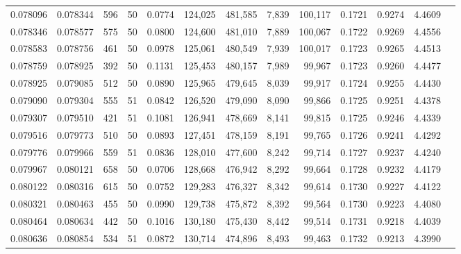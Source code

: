 \begin{tabular}{rrrrrrrrrrrrr}
0.078096 & 0.078344 &   596 &  50 &                                     0.0774 & 124,025 & 481,585 &   7,839 & 100,117 & 0.1721 & 0.9274 & 4.4609 \\
0.078346 & 0.078577 &   575 &  50 &                                     0.0800 & 124,600 & 481,010 &   7,889 & 100,067 & 0.1722 & 0.9269 & 4.4556 \\
0.078583 & 0.078756 &   461 &  50 &                                     0.0978 & 125,061 & 480,549 &   7,939 & 100,017 & 0.1723 & 0.9265 & 4.4513 \\
0.078759 & 0.078925 &   392 &  50 &                                     0.1131 & 125,453 & 480,157 &   7,989 &  99,967 & 0.1723 & 0.9260 & 4.4477 \\
0.078925 & 0.079085 &   512 &  50 &                                     0.0890 & 125,965 & 479,645 &   8,039 &  99,917 & 0.1724 & 0.9255 & 4.4430 \\
0.079090 & 0.079304 &   555 &  51 &                                     0.0842 & 126,520 & 479,090 &   8,090 &  99,866 & 0.1725 & 0.9251 & 4.4378 \\
0.079307 & 0.079510 &   421 &  51 &                                     0.1081 & 126,941 & 478,669 &   8,141 &  99,815 & 0.1725 & 0.9246 & 4.4339 \\
0.079516 & 0.079773 &   510 &  50 &                                     0.0893 & 127,451 & 478,159 &   8,191 &  99,765 & 0.1726 & 0.9241 & 4.4292 \\
0.079776 & 0.079966 &   559 &  51 &                                     0.0836 & 128,010 & 477,600 &   8,242 &  99,714 & 0.1727 & 0.9237 & 4.4240 \\
0.079967 & 0.080121 &   658 &  50 &                                     0.0706 & 128,668 & 476,942 &   8,292 &  99,664 & 0.1728 & 0.9232 & 4.4179 \\
0.080122 & 0.080316 &   615 &  50 &                                     0.0752 & 129,283 & 476,327 &   8,342 &  99,614 & 0.1730 & 0.9227 & 4.4122 \\
0.080321 & 0.080463 &   455 &  50 &                                     0.0990 & 129,738 & 475,872 &   8,392 &  99,564 & 0.1730 & 0.9223 & 4.4080 \\
0.080464 & 0.080634 &   442 &  50 &                                     0.1016 & 130,180 & 475,430 &   8,442 &  99,514 & 0.1731 & 0.9218 & 4.4039 \\
0.080636 & 0.080854 &   534 &  51 &                                     0.0872 & 130,714 & 474,896 &   8,493 &  99,463 & 0.1732 & 0.9213 & 4.3990 \\

\end{tabular}
